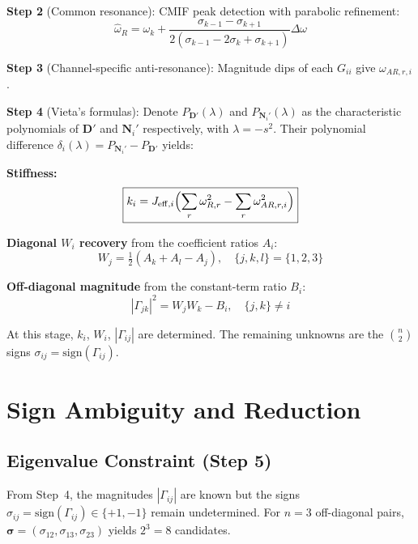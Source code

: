 \documentclass[10pt,twocolumn]{article}
\newcommand{\sgn}{\mathrm{sign}}
\begin{document}
\textbf{Step 2} (Common resonance): CMIF peak detection with parabolic refinement:
\begin{equation}
\hat{\omega}_R = \omega_k + \frac{\sigma_{k-1}-\sigma_{k+1}}{2(\sigma_{k-1}-2\sigma_k+\sigma_{k+1})} \Delta\omega
\label{eq:parabolic}
\end{equation}

\textbf{Step 3} (Channel-specific anti-resonance): Magnitude dips of each $G_{ii}$ give $\omega_{AR,r,i}$.

\textbf{Step 4} (Vieta's formulas): Denote $P_{\bm{D}'}(\lambda)$ and $P_{\bm{N}_i'}(\lambda)$ as the characteristic polynomials of $\bm{D}'$ and $\bm{N}_i'$ respectively, with $\lambda = -s^2$. Their polynomial difference $\delta_i(\lambda) = P_{\bm{N}_i'} - P_{\bm{D}'}$ yields:

\noindent\textbf{Stiffness:}
\begin{equation}
\boxed{k_i = J_{\mathrm{eff},i} \Bigl(\sum_r \omega_{R,r}^2 - \sum_r \omega_{AR,r,i}^2\Bigr)}
\label{eq:K}
\end{equation}

\noindent\textbf{Diagonal $W_i$ recovery} from the coefficient ratios $A_i$:
\begin{equation}
W_j = \tfrac{1}{2}(A_k + A_l - A_j), \quad \{j,k,l\} = \{1,2,3\}
\label{eq:W_recovery}
\end{equation}

\noindent\textbf{Off-diagonal magnitude} from the constant-term ratio $B_i$:
\begin{equation}
|\Gamma_{jk}|^2 = W_j W_k - B_i, \quad \{j,k\} \neq i
\label{eq:Gamma_abs}
\end{equation}

At this stage, $k_i$, $W_i$, $|\Gamma_{ij}|$ are determined. The remaining unknowns are the $\binom{n}{2}$ signs $\sigma_{ij} = \sgn(\Gamma_{ij})$.

\section{Sign Ambiguity and Reduction}
\label{sec:sign_ambiguity}

\subsection{Eigenvalue Constraint (Step 5)}

From Step~4, the magnitudes $|\Gamma_{ij}|$ are known but the signs $\sigma_{ij} = \sgn(\Gamma_{ij}) \in \{+1,-1\}$ remain undetermined. For $n{=}3$ off-diagonal pairs, $\bm{\sigma} = (\sigma_{12}, \sigma_{13}, \sigma_{23})$ yields $2^3 = 8$ candidates.
\end{document}
